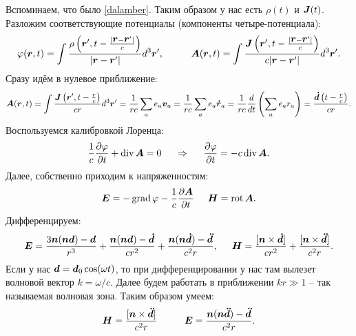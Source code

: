 Вспоминаем, что было \eqref{dalamber}. Таким образом у нас есть $\rho(t)$  и $\mbox{\boldmath $J$}(t)$. Разложим соответствующие потенциалы (компоненты четыре-потенциала):
\begin{equation*}
	\varphi(\mbox{\boldmath $r$},t) = \int \frac{\rho\left(\mbox{\boldmath $r$}' , t - \frac{|\mbox{\boldmath $r$} - \mbox{\boldmath $r$}'|}{c}\right)}{|\mbox{\boldmath $r$} - \mbox{\boldmath $r$}'|} d^3 \mbox{\boldmath $r$}',
	\hspace{1cm}
	\mbox{\boldmath $A$}(\mbox{\boldmath $r$},t) = \int \frac{\mbox{\boldmath $J$}\left(\mbox{\boldmath $r$}' , t - \frac{|\mbox{\boldmath $r$} - \mbox{\boldmath $r$}'|}{c}\right)}{c|\mbox{\boldmath $r$} - \mbox{\boldmath $r$}'|} d^3 \mbox{\boldmath $r$}'.
\end{equation*}
Сразу идём в нулевое приближение:
\begin{equation*}
	\mbox{\boldmath $A$}(\mbox{\boldmath $r$},t) = \int \frac{\mbox{\boldmath $J$}\left(\mbox{\boldmath $r$}' , t - \frac{r}{c}\right)}{c r} d^3 \mbox{\boldmath $r$}'
	=
	\frac{1}{r c} \sum_a e_a \mbox{\boldmath $v$}_a = \frac{1}{rc} \sum_a e_a \mbox{\boldmath $\dot{r}$}_a = \frac{1}{rc} \frac{d}{d t} \left(\sum_a e_a r_a\right)
	= \frac{\mbox{\boldmath $\dot{d}$} \left(t - \frac{r}{c}\right)}{c r}.
\end{equation*}
Воспользуемся калибровкой Лоренца:
\begin{equation*}
	\frac{1}{c} \frac{\partial \varphi}{\partial t} + \mathop{\mathrm{div}}\nolimits \mbox{\boldmath $A$} = 0
	\hspace{0.5 cm}
	\Rightarrow
	\hspace{0.5 cm}
	\frac{\partial \varphi}{\partial t} = - c \mathop{\mathrm{div}}\nolimits \mbox{\boldmath $A$}.
\end{equation*}
Далее, собственно приходим к напряженностям:
\begin{equation*}
	\mbox{\boldmath $E$} = - \mathop{\mathrm{grad}}\nolimits \varphi - \frac{1}{c} \frac{\partial \mbox{\boldmath $A$}}{\partial t}
	\hspace{0.5 cm}
	\mbox{\boldmath $H$} = \mathop{\mathrm{rot}}\nolimits \mbox{\boldmath $A$}.
\end{equation*}
Дифференцируем:
\begin{equation*}
	\mbox{\boldmath $E$} = \frac{3 \mbox{\boldmath $n$} (\mbox{\boldmath $n$} \mbox{\boldmath $d$}) - \mbox{\boldmath $d$}}{r^3} + \frac{\mbox{\boldmath $n$} (\mbox{\boldmath $n$} \mbox{\boldmath $d$}) - \mbox{\boldmath $\dot{d}$}}{c r^2} + \frac{\mbox{\boldmath $n$} (\mbox{\boldmath $n$} \mbox{\boldmath $\dot{d}$}) - \mbox{\boldmath $\ddot{d}$}}{c^2 r},
	\hspace{0.5 cm}
	\mbox{\boldmath $H$} = \frac{[\mbox{\boldmath $n$} \times \mbox{\boldmath $\dot{d}$}]}{c r^2} + \frac{[\mbox{\boldmath $n$} \times \mbox{\boldmath $\ddot{d}$}]}{c^2 r}.
\end{equation*}
Если у нас $\mbox{\boldmath $d$} = \mbox{\boldmath $d$}_0 \cos (\omega t)$, то при дифференцировании у нас там вылезет волновой вектор $k = \omega/c$.
Далее будем работать в приближении $k r \gg 1$ -- так называемая волновая зона.
Таким образом умеем:
\begin{equation*}
	\mbox{\boldmath $H$} = \frac{[\mbox{\boldmath $n$} \times \mbox{\boldmath $\ddot{d}$}]}{c^2 r}
	\hspace{1 cm}
	\mbox{\boldmath $E$} = \frac{\mbox{\boldmath $n$} (\mbox{\boldmath $n$} \mbox{\boldmath $\ddot{d}$}) - \mbox{\boldmath $\ddot{d}$}}{c^2 r}.
\end{equation*}
